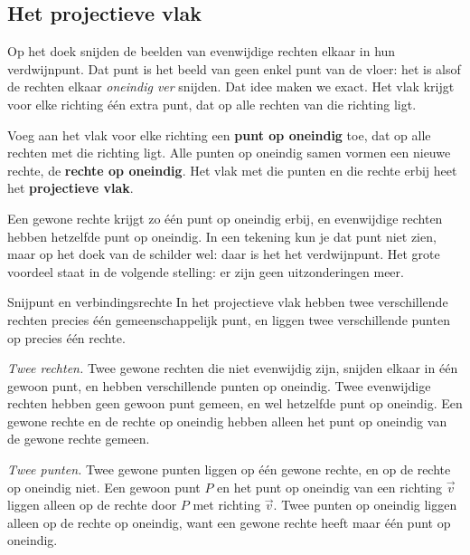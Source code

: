 \subsection{Het projectieve vlak}

Op het doek snijden de beelden van evenwijdige rechten elkaar in hun verdwijnpunt. Dat punt is het beeld van geen enkel punt van de vloer: het is alsof de rechten elkaar \textit{oneindig ver} snijden. Dat idee maken we exact. Het vlak krijgt voor elke richting één extra punt, dat op alle rechten van die richting ligt.

\begin{theorie}
Voeg aan het vlak voor elke richting een \textbf{\textcolor{accent}{punt op oneindig}} toe, dat op alle rechten met die richting ligt. Alle punten op oneindig samen vormen een nieuwe rechte, de \textbf{\textcolor{accent}{rechte op oneindig}}. Het vlak met die punten en die rechte erbij heet het \textbf{\textcolor{accent}{projectieve vlak}}.
\end{theorie}

Een gewone rechte krijgt zo één punt op oneindig erbij, en evenwijdige rechten hebben hetzelfde punt op oneindig. In een tekening kun je dat punt niet zien, maar op het doek van de schilder wel: daar is het het verdwijnpunt. Het grote voordeel staat in de volgende stelling: er zijn geen uitzonderingen meer.

\begin{theorie}
\begin{stelling}{Snijpunt en verbindingsrechte}
In het projectieve vlak hebben twee verschillende rechten precies één gemeenschappelijk punt, en liggen twee verschillende punten op precies één rechte.
\end{stelling}

\begin{bewijs}
\textit{Twee rechten.} Twee gewone rechten die niet evenwijdig zijn, snijden elkaar in één gewoon punt, en hebben verschillende punten op oneindig. Twee evenwijdige rechten hebben geen gewoon punt gemeen, en wel hetzelfde punt op oneindig. Een gewone rechte en de rechte op oneindig hebben alleen het punt op oneindig van de gewone rechte gemeen.

\textit{Twee punten.} Twee gewone punten liggen op één gewone rechte, en op de rechte op oneindig niet. Een gewoon punt $P$ en het punt op oneindig van een richting $\vec v$ liggen alleen op de rechte door $P$ met richting $\vec v$. Twee punten op oneindig liggen alleen op de rechte op oneindig, want een gewone rechte heeft maar één punt op oneindig.
\end{bewijs}
\end{theorie}


